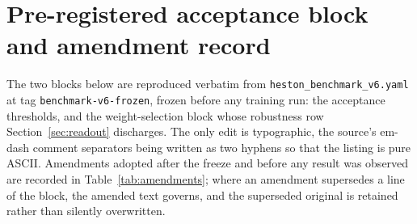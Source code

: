 \documentclass{article}
\begin{document}
\section{Pre-registered acceptance block and amendment record}
\label{app:thresholds}
The two blocks below are reproduced verbatim from
\texttt{heston\_benchmark\_v6.yaml} at tag \texttt{benchmark-v6-frozen}, frozen
before any training run: the acceptance thresholds, and the weight-selection block
whose robustness row Section~\ref{sec:readout} discharges. The only edit is
typographic, the source's em-dash comment separators being written as two hyphens
so that the listing is pure ASCII. Amendments adopted after the freeze and before any result
was observed are recorded in Table~\ref{tab:amendments}; where an amendment
supersedes a line of the block, the amended text governs, and the superseded
original is retained rather than silently overwritten.
\end{document}
